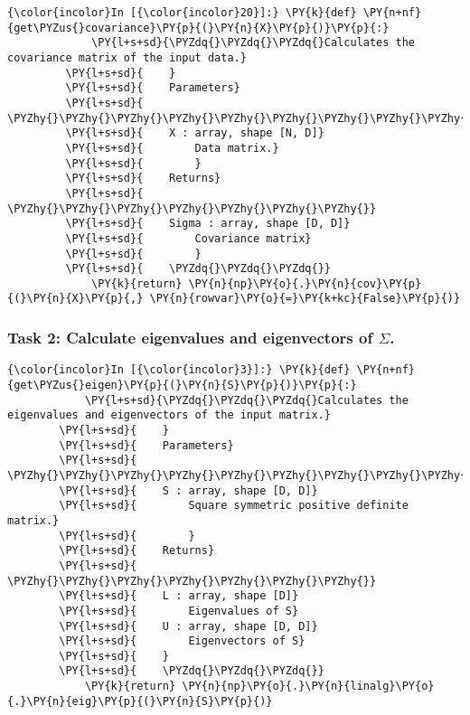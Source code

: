     \begin{Verbatim}[commandchars=\\\{\}]
{\color{incolor}In [{\color{incolor}20}]:} \PY{k}{def} \PY{n+nf}{get\PYZus{}covariance}\PY{p}{(}\PY{n}{X}\PY{p}{)}\PY{p}{:}
             \PY{l+s+sd}{\PYZdq{}\PYZdq{}\PYZdq{}Calculates the covariance matrix of the input data.}
         \PY{l+s+sd}{    }
         \PY{l+s+sd}{    Parameters}
         \PY{l+s+sd}{    \PYZhy{}\PYZhy{}\PYZhy{}\PYZhy{}\PYZhy{}\PYZhy{}\PYZhy{}\PYZhy{}\PYZhy{}\PYZhy{}}
         \PY{l+s+sd}{    X : array, shape [N, D]}
         \PY{l+s+sd}{        Data matrix.}
         \PY{l+s+sd}{        }
         \PY{l+s+sd}{    Returns}
         \PY{l+s+sd}{    \PYZhy{}\PYZhy{}\PYZhy{}\PYZhy{}\PYZhy{}\PYZhy{}\PYZhy{}}
         \PY{l+s+sd}{    Sigma : array, shape [D, D]}
         \PY{l+s+sd}{        Covariance matrix}
         \PY{l+s+sd}{        }
         \PY{l+s+sd}{    \PYZdq{}\PYZdq{}\PYZdq{}}
             \PY{k}{return} \PY{n}{np}\PY{o}{.}\PY{n}{cov}\PY{p}{(}\PY{n}{X}\PY{p}{,} \PY{n}{rowvar}\PY{o}{=}\PY{k+kc}{False}\PY{p}{)}
\end{Verbatim}

    \hypertarget{task-2-calculate-eigenvalues-and-eigenvectors-of-sigma.}{%
\subsubsection{\texorpdfstring{Task 2: Calculate eigenvalues and
eigenvectors of
\(\Sigma\).}{Task 2: Calculate eigenvalues and eigenvectors of \textbackslash{}Sigma.}}\label{task-2-calculate-eigenvalues-and-eigenvectors-of-sigma.}}

    \begin{Verbatim}[commandchars=\\\{\}]
{\color{incolor}In [{\color{incolor}3}]:} \PY{k}{def} \PY{n+nf}{get\PYZus{}eigen}\PY{p}{(}\PY{n}{S}\PY{p}{)}\PY{p}{:}
            \PY{l+s+sd}{\PYZdq{}\PYZdq{}\PYZdq{}Calculates the eigenvalues and eigenvectors of the input matrix.}
        \PY{l+s+sd}{    }
        \PY{l+s+sd}{    Parameters}
        \PY{l+s+sd}{    \PYZhy{}\PYZhy{}\PYZhy{}\PYZhy{}\PYZhy{}\PYZhy{}\PYZhy{}\PYZhy{}\PYZhy{}\PYZhy{}}
        \PY{l+s+sd}{    S : array, shape [D, D]}
        \PY{l+s+sd}{        Square symmetric positive definite matrix.}
        \PY{l+s+sd}{        }
        \PY{l+s+sd}{    Returns}
        \PY{l+s+sd}{    \PYZhy{}\PYZhy{}\PYZhy{}\PYZhy{}\PYZhy{}\PYZhy{}\PYZhy{}}
        \PY{l+s+sd}{    L : array, shape [D]}
        \PY{l+s+sd}{        Eigenvalues of S}
        \PY{l+s+sd}{    U : array, shape [D, D]}
        \PY{l+s+sd}{        Eigenvectors of S}
        \PY{l+s+sd}{    }
        \PY{l+s+sd}{    \PYZdq{}\PYZdq{}\PYZdq{}}
            \PY{k}{return} \PY{n}{np}\PY{o}{.}\PY{n}{linalg}\PY{o}{.}\PY{n}{eig}\PY{p}{(}\PY{n}{S}\PY{p}{)}
\end{Verbatim}


